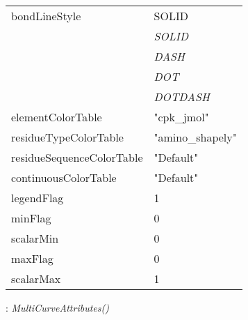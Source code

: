 \documentclass[10pt,a4paper]{report}
\begin{document}
\begin{longtable}{ll}
bondLineStyle  &  SOLID   \\
 & {\it  SOLID} \\
 & {\it  DASH} \\
 & {\it  DOT} \\
 & {\it  DOTDASH} \\
elementColorTable  &  "cpk\_jmol" \\
residueTypeColorTable  &  "amino\_shapely" \\
residueSequenceColorTable  &  "Default" \\
continuousColorTable  &  "Default" \\
legendFlag  &  1 \\
minFlag  &  0 \\
scalarMin  &  0 \\
maxFlag  &  0 \\
scalarMax  &  1 \\
\end{longtable}

\newpage

{}
: {\it MultiCurveAttributes() }\\[-3mm]
\end{document}
